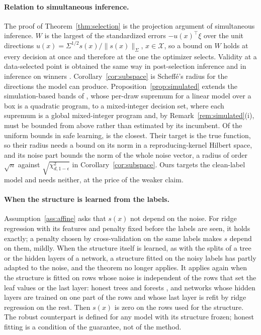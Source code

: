 

\paragraph{Relation to simultaneous inference.}
The proof of Theorem~\ref{thm:selection} is the projection argument of
simultaneous inference. $W$ is the largest of the standardized errors
$-u(x)^\top\xi$ over the unit directions
$u(x) = \Sigma^{1/2}s(x)/\|s(x)\|_\Sigma$, $x \in \mathcal{X}$, so a bound on
$W$ holds at every decision at once and therefore at the one the optimizer
selects. Validity at a data-selected point is obtained the same way in
post-selection inference \citep{berk2013valid} and in inference on winners
\citep{andrews2024inference}. Corollary~\ref{cor:subspace} is Scheff\'e's
radius \citep{scheffe1953method} for the directions the model can produce.
Proposition~\ref{prop:simulated} extends the simulation-based bands of
\citet{liu2005simulation}, whose per-draw supremum for a linear model over a
box is a quadratic program, to a mixed-integer decision set, where each
supremum is a global mixed-integer program and, by
Remark~\ref{rem:simulated}(i), must be bounded from above rather than
estimated by its incumbent. Of the uniform bounds in safe learning,
\citet{fiedler2021practical} is the closest. Their target is the true
function, so their radius needs a bound on its norm in a reproducing-kernel
Hilbert space, and its noise part bounds the norm of the whole noise vector,
a radius of order $\sqrt{n}$ against $\sqrt{\chi^2_{d,1-\epsilon}}$ in
Corollary~\ref{cor:subspace}. Ours targets the clean-label model and needs
neither, at the price of the weaker claim.

\paragraph{When the structure is learned from the labels.}
Assumption~\ref{ass:affine} asks that $s(x)$ not depend on the noise. For
ridge regression with its features and penalty fixed before the labels are
seen, it holds exactly; a penalty chosen by cross-validation on the same
labels makes $s$ depend on them, mildly. When the structure itself is
learned, as with the splits of a tree or the hidden layers of a network, a
structure fitted on the noisy labels has partly adapted to the noise, and the
theorem no longer applies. It applies again when the structure is fitted on
rows whose noise is independent of the rows that set the leaf values or the
last layer: honest trees and forests \citep{wager2018estimation}, and networks
whose hidden layers are trained on one part of the rows and whose last layer
is refit by ridge regression on the rest. Then $s(x)$ is zero on the rows
used for the structure. The robust counterpart is defined for any model with
its structure frozen; honest fitting is a condition of the guarantee, not of
the method.

